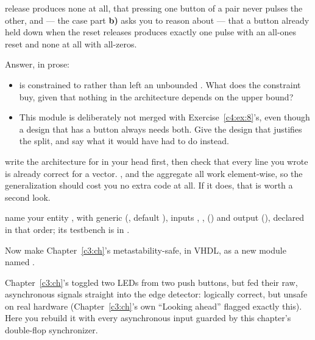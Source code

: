 \begin{parts}
    release produces none at all, that pressing one button of a pair never pulses the other, and
    --- the case part \textbf{b)} asks you to reason about --- that a button already held down when
    the reset releases produces exactly one pulse with an all-ones reset and none at all with
    all-zeros.
  \item Answer, in prose:
    \begin{itemize}
      \item {} is constrained to  rather than left an unbounded
        . What does the constraint buy, given that nothing in the architecture
        depends on the upper bound?
      \item This module is deliberately not merged with Exercise~\ref{c4:ex:8}'s, even though a
        design that has a button always needs both. Give the design that justifies the split, and
        say what it would have had to do instead.
    \end{itemize}
\end{parts}
\note[Tip] write the architecture for  in your head first, then check that every
line you wrote is already correct for a vector. ,  and the aggregate
 all work element-wise, so the generalization should cost you no extra code at
all. If it does, that is worth a second look.


\selfcheck name your entity , with generic 
(, default ), inputs , ,
 () and output 
(), declared in that order; its testbench is in
.

\label{c4:set:6}

\label{c4:ex:10}
Now make Chapter~\ref{c3:ch}'s  metastability-safe, in VHDL, as a new module named
.

Chapter~\ref{c3:ch}'s  toggled two LEDs from two push buttons, but fed their raw,
asynchronous signals straight into the edge detector: logically correct, but unsafe on real
hardware (Chapter~\ref{c3:ch}'s own ``Looking ahead'' flagged exactly this). Here you rebuild it
with every asynchronous input guarded by this chapter's double-flop synchronizer.

